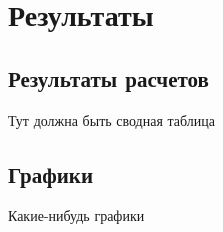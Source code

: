 \documentclass[../../report.tex]{subfiles}
\begin{document}
\chapter{Результаты}

\section{Результаты расчетов}
    Тут должна быть сводная таблица

\section{Графики}
    Какие-нибудь графики
    
\end{document}
